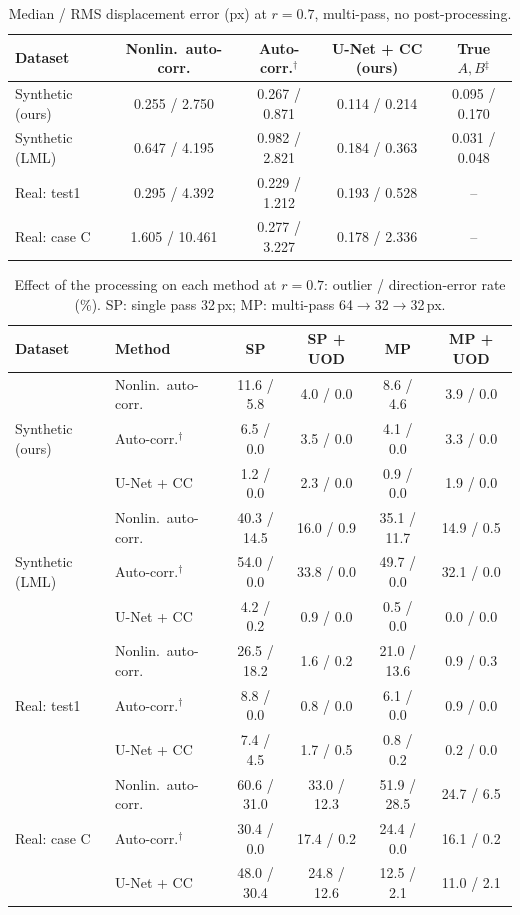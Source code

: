 \begin{table}[t]
\centering
\caption{Median / RMS displacement error (px) at $r=0.7$, multi-pass, no post-processing.}
\label{tab:accuracy}
\small
\begin{tabular}{lcccc}
\toprule
Dataset & Nonlin.\ auto-corr. & Auto-corr.$^\dagger$ & U-Net + CC (ours) & True $A,B$$^\ddagger$ \\
\midrule
Synthetic (ours) & 0.255 / 2.750 & 0.267 / 0.871 & 0.114 / 0.214 & 0.095 / 0.170 \\
Synthetic (LML) & 0.647 / 4.195 & 0.982 / 2.821 & 0.184 / 0.363 & 0.031 / 0.048 \\
Real: test1 & 0.295 / 4.392 & 0.229 / 1.212 & 0.193 / 0.528 & -- \\
Real: case C & 1.605 / 10.461 & 0.277 / 3.227 & 0.178 / 2.336 & -- \\
\bottomrule
\end{tabular}
\end{table}

\begin{table}[t]
\centering
\caption{Effect of the processing on each method at $r=0.7$: outlier / direction-error rate (\%). SP: single pass 32\,px; MP: multi-pass 64$\to$32$\to$32\,px.}
\label{tab:process}
\small
\begin{tabular}{llcccc}
\toprule
Dataset & Method & SP & SP + UOD & MP & MP + UOD \\
\midrule
\multirow{3}{*}{Synthetic (ours)} & Nonlin.\ auto-corr. & 11.6 / 5.8 & 4.0 / 0.0 & 8.6 / 4.6 & 3.9 / 0.0 \\
 & Auto-corr.$^\dagger$ & 6.5 / 0.0 & 3.5 / 0.0 & 4.1 / 0.0 & 3.3 / 0.0 \\
 & U-Net + CC & 1.2 / 0.0 & 2.3 / 0.0 & 0.9 / 0.0 & 1.9 / 0.0 \\
\midrule
\multirow{3}{*}{Synthetic (LML)} & Nonlin.\ auto-corr. & 40.3 / 14.5 & 16.0 / 0.9 & 35.1 / 11.7 & 14.9 / 0.5 \\
 & Auto-corr.$^\dagger$ & 54.0 / 0.0 & 33.8 / 0.0 & 49.7 / 0.0 & 32.1 / 0.0 \\
 & U-Net + CC & 4.2 / 0.2 & 0.9 / 0.0 & 0.5 / 0.0 & 0.0 / 0.0 \\
\midrule
\multirow{3}{*}{Real: test1} & Nonlin.\ auto-corr. & 26.5 / 18.2 & 1.6 / 0.2 & 21.0 / 13.6 & 0.9 / 0.3 \\
 & Auto-corr.$^\dagger$ & 8.8 / 0.0 & 0.8 / 0.0 & 6.1 / 0.0 & 0.9 / 0.0 \\
 & U-Net + CC & 7.4 / 4.5 & 1.7 / 0.5 & 0.8 / 0.2 & 0.2 / 0.0 \\
\midrule
\multirow{3}{*}{Real: case C} & Nonlin.\ auto-corr. & 60.6 / 31.0 & 33.0 / 12.3 & 51.9 / 28.5 & 24.7 / 6.5 \\
 & Auto-corr.$^\dagger$ & 30.4 / 0.0 & 17.4 / 0.2 & 24.4 / 0.0 & 16.1 / 0.2 \\
 & U-Net + CC & 48.0 / 30.4 & 24.8 / 12.6 & 12.5 / 2.1 & 11.0 / 2.1 \\
\bottomrule
\end{tabular}
\end{table}

